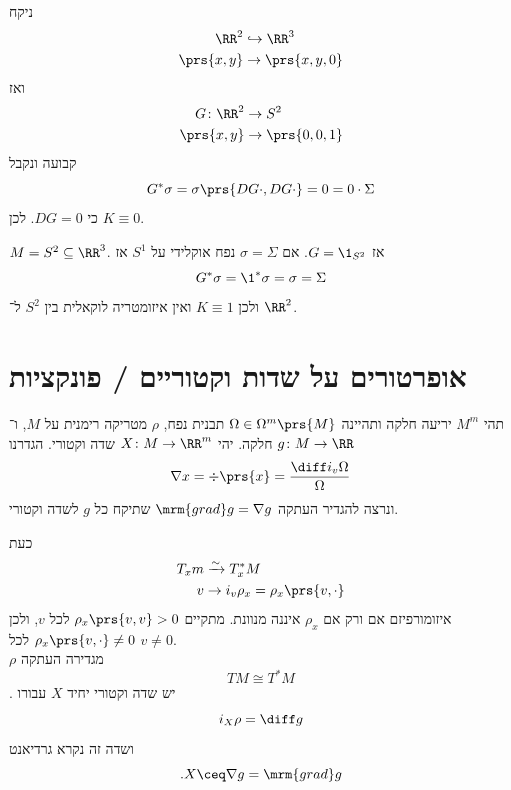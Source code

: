 \documentclass[a4paper,10pt,twoside,openany]{book}
\begin{document}
\begin{example}
ניקח
\begin{align*}
\RR^2 &\hookrightarrow \RR^3 \\
\prs{x,y} &\to \prs{x,y,0}
\end{align*}
ואז
\begin{align*}
G \colon \RR^2 &\to S^2 \\
\prs{x,y} &\to \prs{0,0,1}
\end{align*}
קבועה
ונקבל
\[G^* \sigma = \sigma\prs{DG \cdot, DG \cdot} = 0 = 0 \cdot \Sigma\]
כי
$DG = 0$.
לכן
$K \equiv 0$.
\end{example}

\begin{example}
$M = S^2 \subseteq \RR^3$.
אז
$G = \1_{S^2}$.
אם
$\sigma = \Sigma$
נפח אוקלידי על
$S^1$
אז
\[G^* \sigma = \1^* \sigma = \sigma = \Sigma\]
ולכן
$K\equiv 1$
ואין איזומטריה לוקאלית בין
$S^2$
ל־%
$\RR^2$.
\end{example}

\section{אופרטורים על שדות וקטוריים / פונקציות}

תהי
$M^m$
יריעה חלקה ותהיינה
$\Omega \in \Omega^m \prs{M}$
תבנית נפח,
$\rho$
מטריקה רימנית על
$M$,
ו־%
$g \colon M \to \RR$
חלקה.
יהי
$X \colon M \to \RR^m$
שדה וקטורי.
הגדרנו
\begin{align*}
\nabla x = \div \prs{x} = \frac{\diff i_v \Omega}{\Omega}
\end{align*}
ונרצה להגדיר העתקה
$\mrm{grad}g = \nabla g$
שתיקח כל
$g$
לשדה וקטורי.

כעת
\begin{align*}
T_x m &\xrightarrow{\sim} T_x^* M \\
v &\to i_v \rho_x = \rho_x\prs{v, \cdot}
\end{align*}
איזומורפיזם אם ורק אם
$\rho_x$
איננה מנוונת. מתקיים
$\rho_x\prs{v,v} > 0$
לכל
$v$,
ולכן
$\rho_x\prs{v, \cdot} \neq 0$
לכל
$v \neq 0$.\\
$\rho$
מגדירה העתקה
\[TM \cong T^* M\].
יש שדה וקטורי יחיד
$X$
עבורו
\[i_X \rho = \diff g\]
ושדה זה נקרא גרדיאנט
\[\text{.} X \ceq \nabla g = \mrm{grad} g\]
\end{document}

